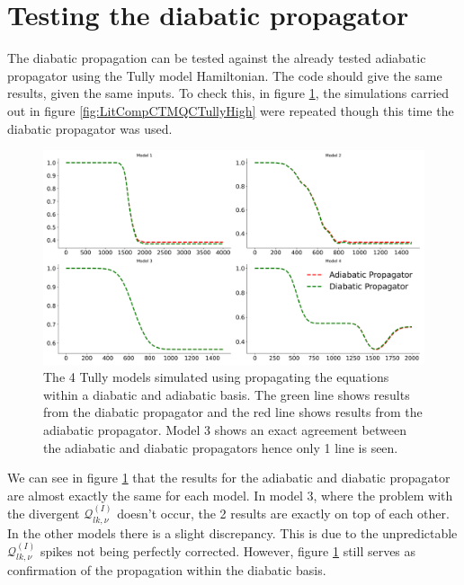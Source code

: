 \section{Testing the diabatic propagator}
The diabatic propagation can be tested against the already tested adiabatic propagator using the Tully model Hamiltonian. The code should give the same results, given the same inputs. To check this, in figure \ref{fig:diab_prop_vs_adiab}, the simulations carried out in figure \ref{fig:LitCompCTMQCTullyHigh} were repeated though this time the diabatic propagator was used.
\begin{figure}[ht]
  \includegraphics[width=\textwidth]{./img/CTMQC/TullyModels/CTMQC_ad_vs_di_wTraj_pops.png}
  \caption{\label{fig:diab_prop_vs_adiab}The 4 Tully models simulated using propagating the equations within a diabatic and adiabatic basis. The green line shows results from the diabatic propagator and the red line shows results from the adiabatic propagator. Model 3 shows an exact agreement between the adiabatic and diabatic propagators hence only 1 line is seen.}
\end{figure}
We can see in figure \ref{fig:diab_prop_vs_adiab} that the results for the adiabatic and diabatic propagator are almost exactly the same for each model. In model 3, where the problem with the divergent $\mathcal{Q}_{lk, \nu}^{(I)}$ doesn't occur, the 2 results are exactly on top of each other. In the other models there is a slight discrepancy. This is due to the unpredictable $\mathcal{Q}_{lk, \nu}^{(I)}$ spikes not being perfectly corrected. However, figure \ref{fig:diab_prop_vs_adiab} still serves as confirmation of the propagation within the diabatic basis.

